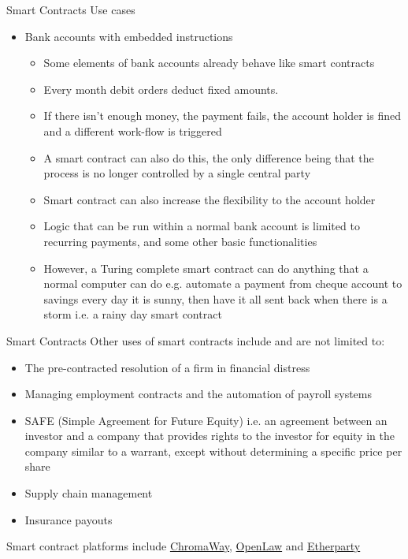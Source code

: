 \documentclass[11pt]{beamer}
\begin{document}

\begin{frame}{Smart Contracts}
	Use cases
	\begin{itemize}
		\item Bank accounts with embedded instructions
		\begin{itemize}
			\item Some elements of bank accounts already behave like smart contracts
			\item Every month debit orders deduct fixed amounts.
			\item If there isn't enough money, the payment fails, the account holder is fined and a different work-flow is triggered
			\item A smart contract can also do this, the only difference being that the process is no longer controlled by a single central party
			\item Smart contract can also increase the flexibility to the account holder
			\item Logic that can be run within a normal bank account is limited to recurring payments, and some other basic functionalities
			\item However, a Turing complete smart contract can do anything that a normal computer can do e.g. automate a payment from cheque account to savings every day it is sunny, then have it all sent back when there is a storm i.e. a rainy day smart contract
		\end{itemize}
	\end{itemize}
\end{frame}


\begin{frame}{Smart Contracts}
	Other uses of smart contracts include and are not limited to:
		\begin{itemize}
			\item The pre-contracted resolution of a firm in financial distress
			\item Managing employment contracts and the automation of payroll systems
			\item SAFE (Simple Agreement for Future Equity) i.e. an agreement between an investor and a company that provides rights to the investor for equity in the company similar to a warrant, except without determining a specific price per share
			\item Supply chain management
			\item Insurance payouts
		\end{itemize}
	Smart contract platforms include \href{https://chromaway.com/}{ChromaWay}, \href{http://openlaw.io/}{OpenLaw} and \href{https://etherparty.io/}{Etherparty}
\end{frame}
\end{document}
